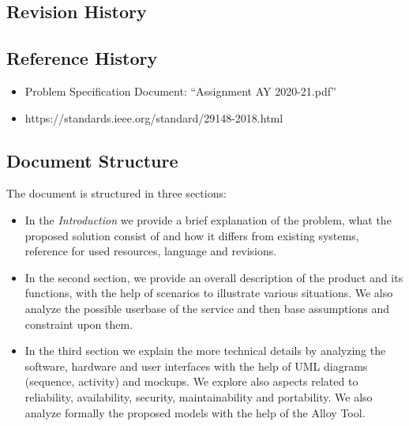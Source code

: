 \subsection{Revision History}
\subsection{Reference History}
\begin{itemize}
    \item Problem Specification Document: ``Assignment AY 2020-21.pdf''
    \item https://standards.ieee.org/standard/29148-2018.html
\end{itemize}
\subsection{Document Structure}

The document is structured in three sections:

\begin{itemize}
    \item In the \emph{Introduction} we provide a brief explanation of the problem, what the proposed solution
        consist of and how it differs from existing systems, reference for used resources, language and revisions.
    \item In the second section, we provide an overall description of the product and its functions, with the help
    of scenarios to illustrate various situations. We also analyze the possible userbase of the service and then base
    assumptions and constraint upon them.
    \item In the third section we explain the more technical details by analyzing the software, hardware and user interfaces
    with the help of UML diagrams (sequence, activity) and mockups.
    We explore also aspects related to reliability, availability, security, maintainability and portability.
    We also analyze formally the proposed models with the help of the Alloy Tool.
\end{itemize}
